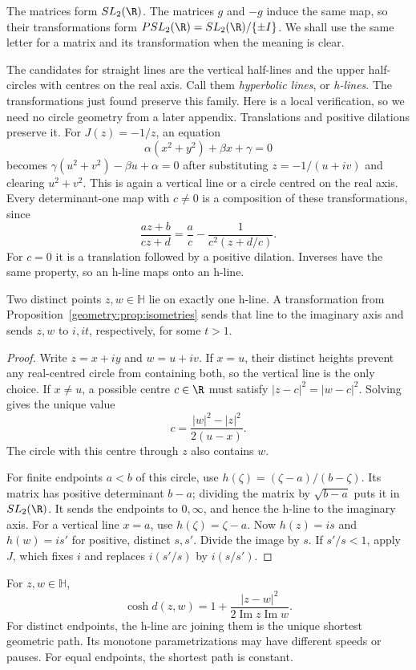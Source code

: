 The matrices form $SL_2(\R)$. The matrices $g$ and $-g$ induce the same map, so their transformations form $PSL_2(\R)=SL_2(\R)/\{\pm I\}$. We shall use the same letter for a matrix and its transformation when the meaning is clear.

The candidates for straight lines are the vertical half-lines and the upper half-circles with centres on the real axis. Call them \emph{hyperbolic lines}, or \emph{h-lines}. The transformations just found preserve this family. Here is a local verification, so we need no circle geometry from a later appendix. Translations and positive dilations preserve it. For $J(z)=-1/z$, an equation
\[
\alpha(x^2+y^2)+\beta x+\gamma=0
\]
becomes $\gamma(u^2+v^2)-\beta u+\alpha=0$ after substituting $z=-1/(u+iv)$ and clearing $u^2+v^2$. This is again a vertical line or a circle centred on the real axis. Every determinant-one map with $c\ne0$ is a composition of these transformations, since
\[
\frac{az+b}{cz+d}=\frac ac-\frac1{c^2(z+d/c)}.
\]
For $c=0$ it is a translation followed by a positive dilation. Inverses have the same property, so an h-line maps onto an h-line.

\begin{lemma}\label{geometry:lem:hlines}
Two distinct points $z,w\in\mathbb H$ lie on exactly one h-line. A transformation from Proposition~\ref{geometry:prop:isometries} sends that line to the imaginary axis and sends $z,w$ to $i,it$, respectively, for some $t>1$.
\end{lemma}

\begin{proof}
Write $z=x+iy$ and $w=u+iv$. If $x=u$, their distinct heights prevent any real-centred circle from containing both, so the vertical line is the only choice. If $x\ne u$, a possible centre $c\in\R$ must satisfy $|z-c|^2=|w-c|^2$. Solving gives the unique value
\[
c=\frac{|w|^2-|z|^2}{2(u-x)}.
\]
The circle with this centre through $z$ also contains $w$.

For finite endpoints $a<b$ of this circle, use $h(\zeta)=(\zeta-a)/(b-\zeta)$. Its matrix has positive determinant $b-a$; dividing the matrix by $\sqrt{b-a}$ puts it in $SL_2(\R)$. It sends the endpoints to $0,\infty$, and hence the h-line to the imaginary axis. For a vertical line $x=a$, use $h(\zeta)=\zeta-a$. Now $h(z)=is$ and $h(w)=is'$ for positive, distinct $s,s'$. Divide the image by $s$. If $s'/s<1$, apply $J$, which fixes $i$ and replaces $i(s'/s)$ by $i(s/s')$.
\end{proof}

\begin{theorem}\label{geometry:thm:hypdist}
For $z,w\in\mathbb H$,
\[
\cosh d(z,w)=1+\frac{|z-w|^2}{2\operatorname{Im}z\operatorname{Im}w}.
\]
For distinct endpoints, the h-line arc joining them is the unique shortest geometric path. Its monotone parametrizations may have different speeds or pauses. For equal endpoints, the shortest path is constant.
\end{theorem}

